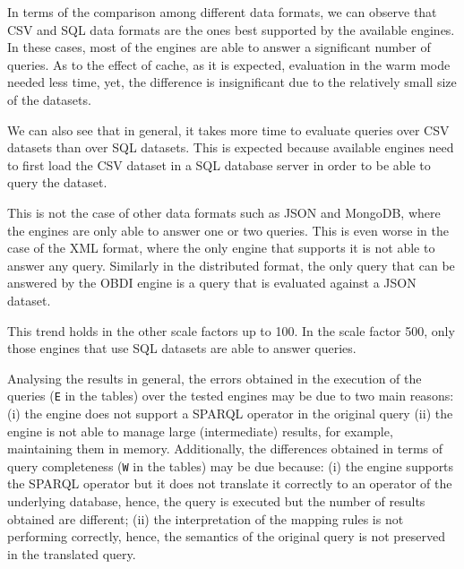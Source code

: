 In terms of the comparison among different data formats, we can observe that CSV and SQL data formats are the ones best supported by the available engines. In these cases, most of the engines are able to answer a significant number of  queries.
As to the effect of cache, as it is expected, evaluation in the warm mode needed less time, yet, the difference is insignificant due to the relatively small size of the datasets. 

We can also see that in general, it takes more time to evaluate queries over CSV datasets than over SQL datasets. This is expected because available engines need to first load the CSV dataset in a SQL database server in order to be able to query the dataset.

This is not  the case of other data formats such as  JSON and MongoDB, where the engines are only able to answer one or two queries. This is even worse in the case of the XML format, where the only engine that supports it is not able to answer any query. Similarly in the distributed format, the only query that can be answered by the OBDI engine is a query that is evaluated against a JSON dataset.

This trend holds in the other scale factors up to 100. In the scale factor 500, only those engines that use SQL datasets are able to answer queries.

Analysing the results in general, the errors obtained in the execution of the queries (\texttt{E} in the tables) over the tested engines may be due to two main reasons: (i) the engine does not support a SPARQL operator in the original query (ii) the engine is not able to manage large (intermediate) results, for example, maintaining them in memory. Additionally, the differences obtained in terms of query completeness (\texttt{W} in the tables) may be due because: (i) the engine supports the SPARQL operator but it does not translate it correctly to an operator of the underlying database, hence, the query is executed but the number of results obtained are different; (ii) the interpretation of the mapping rules is not performing correctly, hence, the semantics of the original query is not preserved in the translated query.




